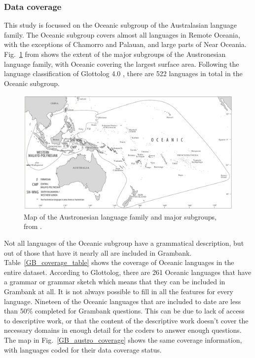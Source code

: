 \documentclass[draft,10pt]{article} %
\begin{document}
\subsubsection{Data coverage} 
This study is focussed on the Oceanic subgroup of the Australasian language family. The Oceanic subgroup covers almost all languages in Remote Oceania, with the exceptions of Chamorro and Palauan, and large parts of Near Oceania. Fig.~\ref{Oceanic_map} from \citet[2]{protooceanicvol5} shows the extent of the major subgroups of the Austronesian language family, with Oceanic covering the largest surface area. Following the language classification of Glottolog 4.0 \citep{glottolog40}, there are 522 languages in total in the Oceanic subgroup.

\begin{figure}[h]
\centering
\includegraphics[width=\textwidth]{illustrations/ross_pawley_osmond_protooceanic_vol5.png}
\caption{{Map of the Austronesian language family and major subgroups, from \citet[2]{protooceanicvol5}.}}
\label{Oceanic_map}
\end{figure} 

Not all languages of the Oceanic subgroup have a grammatical description, but out of those that have it nearly all are included in Grambank. Table~\ref{GB_coverage_table} shows the coverage of Oceanic languages in the entire dataset. According to Glottolog, there are 261 Oceanic languages that have a grammar or grammar sketch which means that they can be included in Grambank at all. It is not always possible to fill in all the features for every language. Nineteen of the Oceanic languages that are included to date are less than 50\% completed for Grambank questions. This can be due to lack of access to descriptive work, or that the content of the descriptive work doesn't cover the necessary domains in enough detail for the coders to answer enough questions. The map in Fig.~\ref{GB_austro_coverage} shows the same coverage information, with languages coded for their data coverage status.
\end{document}
